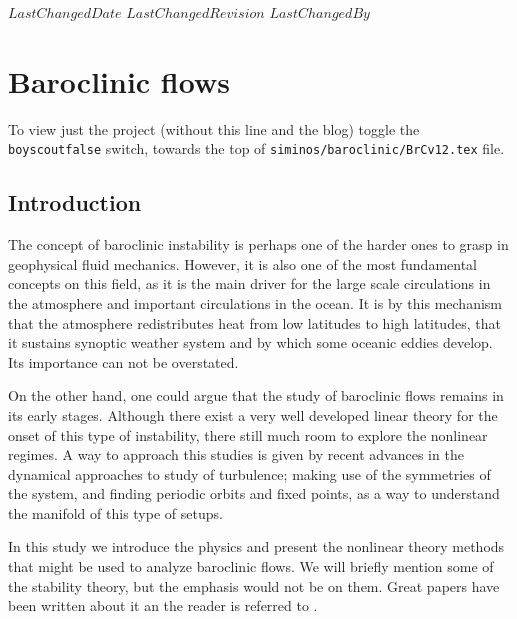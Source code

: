 {$LastChangedDate$}
{$LastChangedRevision$} {$LastChangedBy$}

\chapter{Baroclinic flows}
\label{chap:baroclinic}

    \ifboyscout
To view just the project (without this line and the blog)
toggle the \texttt{boyscoutfalse} switch, towards the top of
\texttt{siminos/baroclinic/BrCv12.tex} file.
    \fi

\section{Introduction}
\label{s:intro}

The concept of baroclinic instability is perhaps one of the harder ones
to grasp in geophysical fluid mechanics. However, it is also one of the
most fundamental concepts on this field, as it is the main driver for the
large scale circulations in the atmosphere and important circulations in
the ocean. It is by this mechanism that the atmosphere redistributes heat
from low latitudes to high latitudes, that it sustains synoptic weather
system and by which some oceanic eddies develop. Its importance can not
be overstated.

On the other hand, one could argue that the study of baroclinic flows
remains in its early stages. Although there exist a very well developed
linear theory for the onset of this type of instability, there still much
room to explore the nonlinear regimes. A way to approach this studies is
given by recent advances in the dynamical approaches to study of
turbulence;
making use of the symmetries of the system, and finding periodic orbits
and fixed points, as a way to understand the manifold of this type of
setups.

In this study we introduce the physics and present the nonlinear theory
methods that might be used to analyze baroclinic flows. We will briefly
mention some of the stability theory, but the emphasis would not be on
them. Great papers have been written about it an the reader is referred
to .


